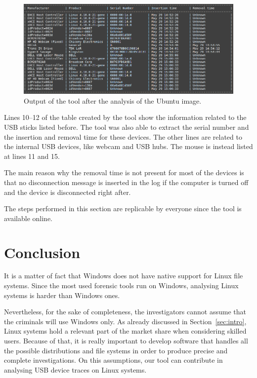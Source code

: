 \documentclass[a4paper,twocolumn]{article}
\begin{document}
\begin{figure}[t]
\centering
\includegraphics[width=\textwidth]{images/ubu_res.PNG}
\caption{Output of the tool after the analysis of the Ubuntu image.}
\label{fig:restool}
\end{figure}

Lines 10--12 of the table created by the tool show the information related to
the USB sticks listed before. The tool was also able to extract the serial
number and the insertion and removal time for these devices. The other lines are
related to the internal USB devices, like webcam and USB hubs. The mouse is
instead listed at lines 11 and 15.

The main reason why the removal time is not present for most of the devices is
that no disconnection message is inserted in the log if the computer is turned
off and the device is disconnected right after.

The steps performed in this section are replicable by everyone since the tool is
available online.~\cite{ourtool}

\section{Conclusion}
\label{sec:concl}
It is a matter of fact that Windows does not have native support for Linux file
systems. Since the most used forensic tools run on Windows, analysing Linux
systems is harder than Windows ones.

Nevertheless, for the sake of completeness, the investigators cannot assume that
the criminals will use Windows only. As already discussed in
Section~\ref{sec:intro}, Linux systems hold a relevant part of the market share
when considering skilled users. Because of that, it is really important to
develop software that handles all the possible distributions and file systems in
order to produce precise and complete investigations. On this assumptions, our
tool can contribute in analysing USB device traces on Linux systems.
\end{document}
